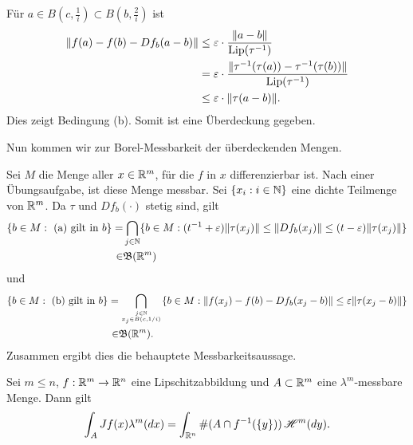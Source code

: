 \documentclass[a4paper,twoside,DIV15,BCOR12mm]{scrbook}
\newcommand{\HM}{\H}
\DeclareMathOperator{\Lip}{Lip}
\begin{document}
\begin{beweis}
Für $a\in B(c,\frac1i) \subset B(b,\frac2i)$ ist 
\begin{align*}
\|f(a) - f(b) - Df_b(a-b)\|
&\le \ep\cdot\frac{\|a-b\|}{\Lip(\tau^{-1})} \\
&= \ep\cdot\frac{\|\tau^{-1}(\tau(a)) - \tau^{-1}(\tau(b))\|}{\Lip(\tau^{-1})} \\
&\le \ep\cdot \|\tau(a-b)\|.
\end{align*}
Dies zeigt Bedingung (b). Somit ist eine Überdeckung gegeben.

Nun kommen wir zur Borel-Messbarkeit der überdeckenden Mengen.

Sei $M$ die Menge aller $x\in \mathbb{R}^m$, für die $f$ in $x$ differenzierbar ist. Nach einer 
Übungsaufgabe, ist diese Menge messbar. Sei $\{x_i:i\in \mathbb{N}\}$ eine dichte Teilmenge von $\mathbb{R}^m$. 
Da $\tau $ und $Df_b(\cdot)$ stetig sind, gilt
\begin{align*}
\{b\in M:\text{ (a) gilt in } b\}=&\bigcap_{j\in\mathbb{N}}\{b\in M:(t^{-1}+\varepsilon)\|\tau(x_j)\|\le \|Df_b(x_j)\|\le (t-\varepsilon)\|\tau(x_j)\|\}\\
\in &\mathfrak{B}(\mathbb{R}^m)
\end{align*}
und
\begin{align*}
\{b\in M:\text{ (b) gilt in } b\}=&\bigcap_{j\in\mathbb{N}\atop x_j\in B(c,1/i)}\{b\in M:
\|f(x_j)-f(b)-Df_b(x_j-b)\|\le\varepsilon\|\tau(x_j-b)\|\}\\
\in &\mathfrak{B}(\mathbb{R}^m).
\end{align*}
Zusammen ergibt dies die behauptete Messbarkeitsaussage.
\end{beweis}

\begin{satz}
Sei $m\le n$, $f:\mathbb{R}^m\to\mathbb{R}^n$ eine Lipschitzabbildung und $A\subset\mathbb{R}^m$ eine $\lambda^m$-messbare Menge. Dann gilt
\[
\int_A Jf(x) \lambda^m(dx) = \int_{\MdR^n} \#(A\cap f^{-1}(\{y\}))\,\HM^m(dy).
\]
\end{satz}
\end{document}
